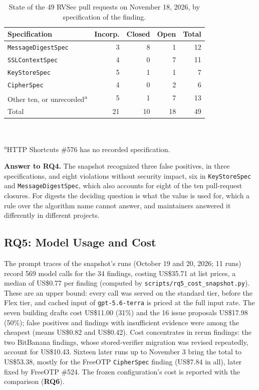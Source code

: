 \documentclass[conference]{IEEEtran}
\newcommand{\researchq}[1]{\textbf{RQ#1}}
\begin{document}
\begin{table}[H]
\centering
\caption{State of the 49 RVSec pull requests on November 18, 2026, by
specification of the finding.}
\label{tab:pr-spec}
\footnotesize
\begin{tabular}{lrrrr}
\toprule
Specification & Incorp. & Closed & Open & Total \\
\midrule
\texttt{MessageDigestSpec} & 3 & 8 & 1 & 12 \\
\texttt{SSLContextSpec}    & 4 & 0 & 7 & 11 \\
\texttt{KeyStoreSpec}      & 5 & 1 & 1 & 7 \\
\texttt{CipherSpec}        & 4 & 0 & 2 & 6 \\
Other ten, or unrecorded\textsuperscript{a} & 5 & 1 & 7 & 13 \\
\midrule
Total & 21 & 10 & 18 & 49 \\
\bottomrule
\end{tabular}
\\[2pt]\raggedright\scriptsize\textsuperscript{a}HTTP Shortcuts \#576 has no
recorded specification.
\end{table}

\textbf{Answer to \researchq{4}.} The snapshot recognized three false
positives, in three specifications, and eight violations without security
impact, six in \texttt{KeyStoreSpec} and \texttt{MessageDigestSpec}, which
also accounts for eight of the ten pull-request closures. For digests the
deciding question is what the value is used for, which a rule over the
algorithm name cannot answer, and maintainers answered it differently in
different projects.

\subsection{\researchq{5}: Model Usage and Cost}

The prompt traces of the snapshot's runs (October 19 and 20, 2026;
11 runs) record 569 model calls for the 34 findings,
costing US\$35.71 at list prices, a median of US\$0.77 per
finding (computed by \texttt{scripts/rq5\_cost\_snapshot.py}). These are an upper bound: every call was served on the standard tier,
before the Flex tier, and cached input of \texttt{gpt-5.6-terra} is priced at
the full input rate. The seven
building drafts cost US\$11.00 (31\%) and the 16 issue
proposals US\$17.98 (50\%); false positives and findings
with insufficient evidence were among the cheapest (means US\$0.82 and
US\$0.42). Cost concentrates in rerun findings: the two BitBanana
findings, whose stored-verifier migration was revised repeatedly, account for
US\$10.43. Sixteen later runs up to November 3 bring the total to
US\$53.38, mostly for the FreeOTP \texttt{CipherSpec} finding
(US\$7.84 in all), later fixed by FreeOTP \#524. The frozen configuration's
cost is reported with the comparison (\researchq{6}).
\end{document}
